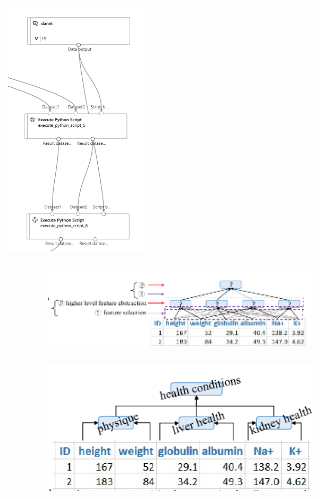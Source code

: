 \begin{figure}[H]
    \begin{subfigure}[m]{0.49\textwidth}
        \centering
        \includegraphics[width=0.4\textwidth]{images/danet}
        \label{fig:danet-pipe}
    \end{subfigure}
    \hfill
    \begin{subfigure}[m]{0.49\textwidth}
        \begin{subfigure}[m]{\textwidth}
            \centering
            \includegraphics[width=\textwidth]{images/danet_1}
        \end{subfigure}
        \begin{subfigure}[m]{\textwidth}
            \centering
            \includegraphics[width=\textwidth]{images/danet_2}
        \end{subfigure}
        \label{fig:danet-abst}
    \end{subfigure}

\end{figure}





